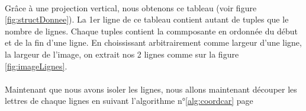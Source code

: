 \documentclass[a4paper]{article}
\begin{document}
			\paragraph{} Grâce à une projection vertical, nous obtenons ce tableau (voir figure \ref{fig:structDonnee}). La 1er ligne de ce tableau contient autant de tuples que le nombre de lignes. Chaque tuples contient la commposante en ordonnée du début et de la fin d'une ligne. En choississant arbitrairement comme largeur d'une ligne, la largeur de l'image, on extrait nos 2 lignes comme sur la figure \ref{fig:imageLignes}.
			\paragraph{} Maintenant que nous avons isoler les lignes, nous allons maintenant découper les lettres de chaque lignes en suivant l'algorithme n°\ref{alg:coordcar} page \pageref{alg:coordcar}
\end{document}
